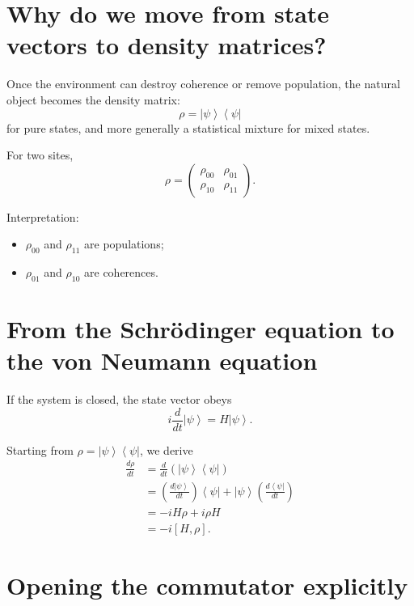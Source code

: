 \documentclass[11pt,a4paper]{article}
\newcommand{\ket}[1]{\left|#1\right\rangle}
\newcommand{\bra}[1]{\left\langle#1\right|}
\begin{document}
\section{Why do we move from state vectors to density matrices?}

Once the environment can destroy coherence or remove population, the natural
object becomes the density matrix:
\begin{equation}
\rho = \ket{\psi}\bra{\psi}
\end{equation}
for pure states, and more generally a statistical mixture for mixed states.

For two sites,
\begin{equation}
\rho =
\begin{pmatrix}
\rho_{00} & \rho_{01} \\
\rho_{10} & \rho_{11}
\end{pmatrix}.
\end{equation}

Interpretation:
\begin{itemize}
  \item $\rho_{00}$ and $\rho_{11}$ are populations;
  \item $\rho_{01}$ and $\rho_{10}$ are coherences.
\end{itemize}

\section{From the Schr\"odinger equation to the von Neumann equation}

If the system is closed, the state vector obeys
\begin{equation}
i\frac{d}{dt}\ket{\psi} = H\ket{\psi}.
\end{equation}

Starting from $\rho = \ket{\psi}\bra{\psi}$, we derive
\begin{align}
\frac{d\rho}{dt}
&= \frac{d}{dt}\left(\ket{\psi}\bra{\psi}\right) \\
&= \left(\frac{d\ket{\psi}}{dt}\right)\bra{\psi} + \ket{\psi}\left(\frac{d\bra{\psi}}{dt}\right) \\
&= -iH\rho + i\rho H \\
&= -i[H,\rho].
\end{align}

\section{Opening the commutator explicitly}
\end{document}
